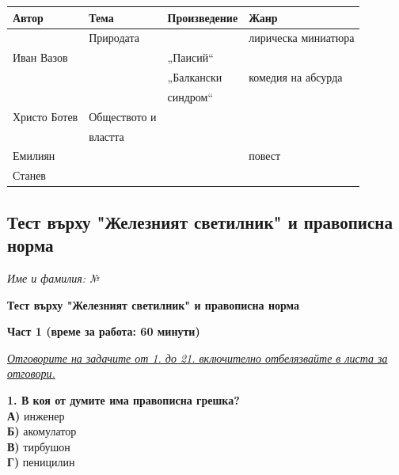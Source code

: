 \documentclass[12pt,a4paper]{article}
\renewcommand{\arraystretch}{1.2}
\begin{document}
\noindent
\renewcommand{\arraystretch}{1.8}
\begin{tabularx}{\textwidth}{|>{\raggedright\arraybackslash}X|>{\raggedright\arraybackslash}X|>{\raggedright\arraybackslash}X|>{\raggedright\arraybackslash}X|}
\hline
\hfil\bfseries Автор & \hfil\bfseries Тема & \hfil\bfseries Произведение & \hfil\bfseries Жанр \\ \hline
 & Природата &  & лирическа миниатюра \\ \hline
Иван Вазов &  & „Паисий“ &  \\ \hline
 &  & „Балкански & комедия на абсурда \\ 
 &  & синдром“ &  \\ \hline
Христо Ботев & Обществото и &  &  \\ 
 & властта &  &  \\ \hline
Емилиян &  &  & повест \\ 
Станев &  &  &  \\ \hline
\end{tabularx}

\newpage
\subsection{Тест върху "Железният светилник" и правописна норма}
\noindent
\textit{Име и фамилия:} \dotfill \textit{№} \makebox[2cm]{\dotfill}

\vspace{0.6cm}

\begin{center}
    {\large\bfseries Тест върху "Железният светилник" и правописна норма}
\end{center}

\vspace{0.6cm}

\noindent
\textbf{Част 1 (време за работа: 60 минути)}

\vspace{0.3cm}

\noindent
\underline{\textit{Отговорите на задачите от 1. до 21. включително отбелязвайте в листа за отговори.}}

\vspace{0.5cm}

\noindent
\textbf{1. В коя от думите има правописна грешка?} \\
\noindent
\textbf{А)} инженер \\
\textbf{Б)} акомулатор \\
\textbf{В)} тирбушон \\
\textbf{Г)} пеницилин
\end{document}
